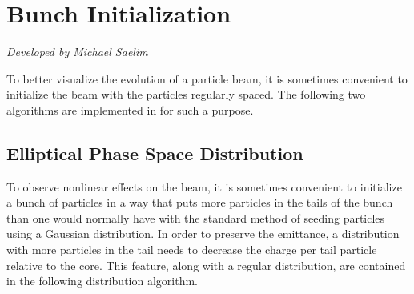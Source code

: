 \section{Bunch Initialization}
\label{s:bunch.init}

\textit{Developed by Michael Saelim}

To better visualize the evolution of a particle beam, it is 
sometimes convenient to initialize the beam with
the particles regularly spaced. The following two algorithms
are implemented in \bmad for such a purpose.

\subsection{Elliptical Phase Space Distribution}
\label{ss:ellipse.init}

To observe nonlinear effects on the beam, it is sometimes convenient to
initialize a bunch of particles in a way that puts more particles in the
tails of the bunch than one would normally have with the standard method
of seeding particles using a Gaussian distribution. In order to preserve
the emittance, a distribution with more particles in the tail needs to
decrease the charge per tail particle relative to the core. 
This feature, along with a regular distribution,
are contained in the following 
distribution algorithm. 

